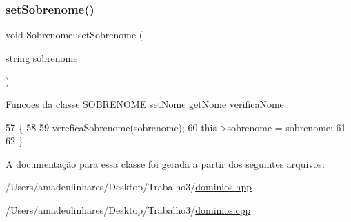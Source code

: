 \subsubsection{\texorpdfstring{set\+Sobrenome()}{setSobrenome()}}
{\footnotesize\ttfamily void Sobrenome\+::set\+Sobrenome (\begin{DoxyParamCaption}\item[{string}]{sobrenome }\end{DoxyParamCaption})}

Funcoes da classe S\+O\+B\+R\+E\+N\+O\+ME set\+Nome get\+Nome verifica\+Nome 
\begin{DoxyCode}
57 \{
58 
59     vereficaSobrenome(sobrenome);
60     this->sobrenome = sobrenome;
61 
62 \}
\end{DoxyCode}


A documentação para essa classe foi gerada a partir dos seguintes arquivos\+:\begin{DoxyCompactItemize}
\item 
/\+Users/amadeulinhares/\+Desktop/\+Trabalho3/\mbox{\hyperlink{dominios_8hpp}{dominios.\+hpp}}\item 
/\+Users/amadeulinhares/\+Desktop/\+Trabalho3/\mbox{\hyperlink{dominios_8cpp}{dominios.\+cpp}}\end{DoxyCompactItemize}

